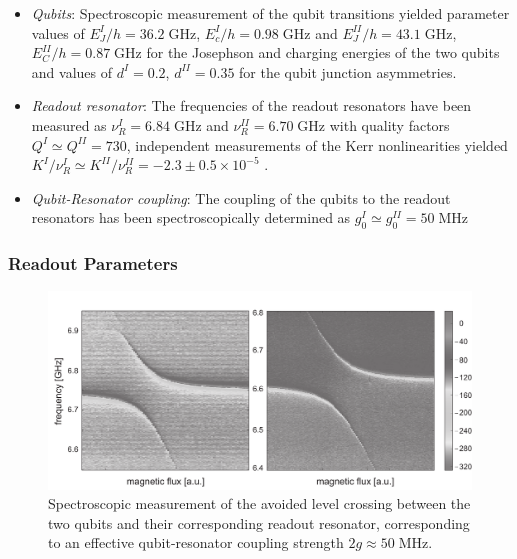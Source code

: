 \begin{itemize}
\item \textit{Qubits}: Spectroscopic measurement of the qubit transitions yielded parameter values of $E_J^I / h = 36.2\; \mathrm{GHz}$, $E_c^I / h = 0.98 \; \mathrm{GHz}$ and $E_J^{II} / h = 43.1\; \mathrm{GHz}$, $E_C^{II} / h = 0.87 \; \mathrm{GHz}$ for the Josephson and charging energies of the two qubits and values of $d^I = 0.2$, $d^{II} =  0.35$ for the qubit junction asymmetries.
\item \textit{Readout resonator}: The frequencies of the readout resonators have been measured as $\nu_R^I = 6.84 \; \mathrm{GHz}$ and $\nu_R^{II} = 6.70 \; \mathrm{GHz}$ with quality factors $Q^I \simeq Q^{II} = 730$, independent measurements of the Kerr nonlinearities yielded $K^I / \nu_R^I \simeq K^{II} / \nu_R^{II} = -2.3\pm 0.5 \times 10^{-5}$ .
\item \textit{Qubit-Resonator coupling}: The coupling of the qubits to the readout resonators has been spectroscopically determined as $g_0^I \simeq g_0^{II} = 50 \; \mathrm{MHz}$
\end{itemize}

\subsubsection{Readout Parameters}

\begin{figure}[htb!]
	\centering
	\includegraphics[width=1\textwidth]{"./data/ct5/cavity anticrossing/qubits_anticrossing_bw"}
	\caption[Spectroscopic measurement of the avoided level crossing between the two qubits and their corresponding readout resonator]{Spectroscopic measurement of the avoided level crossing between the two qubits and their corresponding readout resonator, corresponding to an effective qubit-resonator coupling strength $2g\approx 50\;\mathrm{MHz}$.}
	\label{fig:qubit_resonator_anticrossing}
\end{figure}

